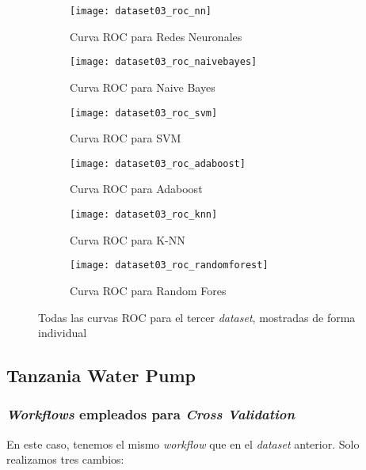 \documentclass[11pt]{article}
\begin{document}
\begin{figure}[H]
    \centering

    \begin{subfigure}[b]{0.4 \textwidth}
        \texttt{[image: dataset03\_roc\_nn]}
        \caption{Curva ROC para Redes Neuronales}
    \end{subfigure}
    \begin{subfigure}[b]{0.4 \textwidth}
        \texttt{[image: dataset03\_roc\_naivebayes]}
        \caption{Curva ROC para Naive Bayes}
    \end{subfigure}

    \begin{subfigure}[b]{0.4 \textwidth}
        \texttt{[image: dataset03\_roc\_svm]}
        \caption{Curva ROC para SVM}
    \end{subfigure}
    \begin{subfigure}[b]{0.4 \textwidth}
        \texttt{[image: dataset03\_roc\_adaboost]}
        \caption{Curva ROC para Adaboost}
    \end{subfigure}

    \begin{subfigure}[b]{0.4 \textwidth}
        \texttt{[image: dataset03\_roc\_knn]}
        \caption{Curva ROC para K-NN}
    \end{subfigure}
    \begin{subfigure}[b]{0.4 \textwidth}
        \texttt{[image: dataset03\_roc\_randomforest]}
        \caption{Curva ROC para Random Fores}
    \end{subfigure}

    \caption{Todas las curvas ROC para el tercer \emph{dataset}, mostradas de forma individual}
\end{figure}

\pagebreak

\subsection{Tanzania Water Pump}

\subsubsection{\emph{Workflows} empleados para \emph{Cross Validation}}

En este caso, tenemos el mismo \emph{workflow} que en el \emph{dataset} anterior. Solo realizamos tres cambios:
\end{document}

